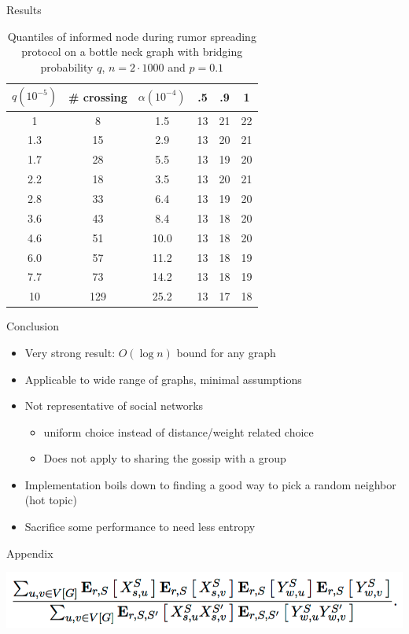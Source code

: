 \documentclass{beamer}
\begin{document}
\begin{frame}{Results}
  \begin{table}
\centering
\begin{tabular}{c|c|c||c|c|c}
  $q (10^{-5})$ & \# crossing & $\alpha (10^{-4})$ & .5 & .9 & 1\\
  \hline
  1 & 8 & 1.5 & 13 & 21 & 22 \\
1.3 & 15 & 2.9 & 13 & 20 & 21 \\
1.7 & 28 & 5.5 & 13 & 19 & 20 \\
2.2 & 18 & 3.5 & 13 & 20 & 21 \\
2.8 & 33 & 6.4 & 13 & 19 & 20 \\
3.6 & 43 & 8.4 & 13 & 18 & 20 \\
4.6 & 51 & 10.0 & 13 & 18 & 20 \\
6.0 & 57 & 11.2 & 13 & 18 & 19 \\
7.7 & 73 & 14.2 & 13 & 18 & 19 \\
10 & 129 & 25.2 & 13 & 17 & 18 \\
\end{tabular}
\caption{Quantiles of informed node during rumor spreading protocol on a bottle neck graph with bridging probability $q$, $n = 2 \cdot 1000$ and $p = 0.1$}
\label{tab:quantiles}
\end{table}
\end{frame}

\begin{frame}{Conclusion}

\begin{itemize}
  \item Very strong result: $O(\log n)$ bound for any graph
  \item Applicable to wide range of graphs, minimal assumptions
  \item Not representative of social networks
  \begin{itemize}
    \item uniform choice instead of distance/weight related choice
    \item Does not apply to sharing the gossip with a group
  \end{itemize}
  \item Implementation boils down to finding a good way to pick a random neighbor (hot topic)
  \item Sacrifice some performance to need less entropy
\end{itemize}
  
\end{frame}

\begin{frame}
  
\end{frame}

\begin{frame}{Appendix}
  \begin{center}
    \includegraphics[width=1\linewidth]{lower_bound_exp.png}
  \end{center}
\end{frame}
\end{document}
